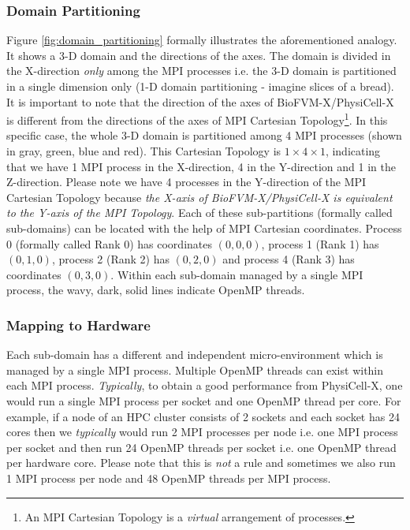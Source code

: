 \documentclass[12pt]{article}
\begin{document}
\subsubsection{Domain Partitioning}
Figure \ref{fig:domain_partitioning} formally illustrates the aforementioned analogy. It shows a 3-D domain and the directions of the axes. The domain is divided in the X-direction \textit{only} among the MPI processes i.e. the 3-D domain is partitioned in a single dimension only (1-D domain partitioning - imagine slices of a bread). It is important to note that the direction of the axes of BioFVM-X/PhysiCell-X is different from the directions of the axes of MPI Cartesian Topology\footnote{An MPI Cartesian Topology is a \textit{virtual} arrangement of processes.}. In this specific case, the whole 3-D domain is partitioned among 4 MPI processes (shown in gray, green, blue and red). This Cartesian Topology is $1 \times 4 \times 1$, indicating that we have 1 MPI process in the X-direction, 4 in the Y-direction and 1 in the Z-direction. Please note we have 4 processes in the Y-direction of the MPI Cartesian Topology because \textit{the X-axis of BioFVM-X/PhysiCell-X is equivalent to the Y-axis of the MPI Topology}. Each of these sub-partitions (formally called sub-domains) can be located with the help of MPI Cartesian coordinates. Process 0 (formally called Rank 0) has coordinates $(0,0,0)$, process 1 (Rank 1) has $(0,1,0)$, process 2 (Rank 2) has $(0,2,0)$ and process 4 (Rank 3) has coordinates $(0,3,0)$. Within each sub-domain managed by a single MPI process, the wavy, dark, solid lines indicate OpenMP threads.  

\subsubsection{Mapping to Hardware}
Each sub-domain has a different and independent micro-environment which is managed by a single MPI process. Multiple OpenMP threads can exist within each MPI process. \textit{Typically}, to obtain a good performance from PhysiCell-X, one would run a single MPI process per socket and one OpenMP thread per core. For example, if a node of an HPC cluster consists of 2 sockets and each socket has 24 cores then we \textit{typically} would run 2 MPI processes per node i.e. one MPI process per socket and then run 24 OpenMP threads per socket i.e. one OpenMP thread per hardware core. Please note that this is \textit{not} a rule and sometimes we also run 1 MPI process per node and 48 OpenMP threads per MPI process. 
\end{document}
